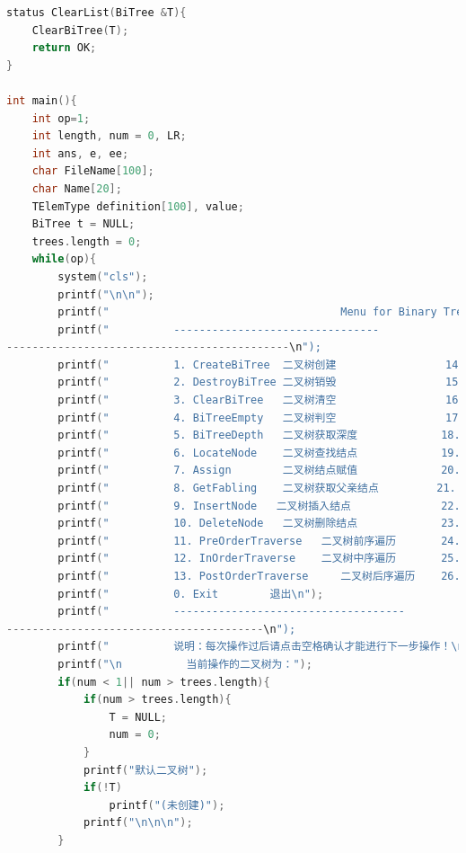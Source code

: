 \documentclass[supercite]{Experimental_Report}
\theoremstyle{definition}
\begin{document}
\begin{lstlisting}[language=c]
status ClearList(BiTree &T){
	ClearBiTree(T);
	return OK;
}

int main(){
    int op=1;
    int length, num = 0, LR;
    int ans, e, ee;
    char FileName[100];
    char Name[20];
    TElemType definition[100], value;
    BiTree t = NULL;
    trees.length = 0;
    while(op){
        system("cls");
        printf("\n\n");
        printf("                                    Menu for Binary Tree  \n");
        printf("          --------------------------------
--------------------------------------------\n");
        printf("    	  1. CreateBiTree  二叉树创建                 14. LevelOrderTraverse    二叉树层序遍历\n");
        printf("    	  2. DestroyBiTree 二叉树销毁                 15. MaxPathSum            二叉树最大路径和\n");
        printf("    	  3. ClearBiTree   二叉树清空                 16. LowestCommonAncestor  二叉树最近祖先\n");
        printf("    	  4. BiTreeEmpty   二叉树判空                 17. InvertTree            二叉树翻转\n");
        printf("    	  5. BiTreeDepth   二叉树获取深度             18. SaveList              二叉树文件保存\n");
        printf("    	  6. LocateNode    二叉树查找结点             19. LoadList              二叉树文件录入\n");
        printf("          7. Assign        二叉树结点赋值             20. AddList               多二叉树表添加\n");
        printf("          8. GetFabling    二叉树获取父亲结点         21. DestroyList           多二叉树表销毁\n");
        printf("          9. InsertNode   二叉树插入结点              22. LocateList            多二叉树表位置查找\n");
        printf("          10. DeleteNode   二叉树删除结点             23. TraverseList          多二叉树表遍历\n");
        printf("          11. PreOrderTraverse   二叉树前序遍历       24. SelectList            二叉树操作选择\n");
        printf("          12. InOrderTraverse    二叉树中序遍历       25. ClearList             多二叉树表清空\n");
        printf("          13. PostOrderTraverse     二叉树后序遍历    26. GetSibling    二叉树获取兄弟结点\n"); 
        printf("    	  0. Exit        退出\n");
        printf("          ------------------------------------
----------------------------------------\n");
        printf("          说明：每次操作过后请点击空格确认才能进行下一步操作！\n");
        printf("\n          当前操作的二叉树为：");
        if(num < 1|| num > trees.length){
            if(num > trees.length){
                T = NULL;
                num = 0;
            }
            printf("默认二叉树");
            if(!T)
                printf("(未创建)");
            printf("\n\n\n");
        }

\end{lstlisting}
\end{document}
